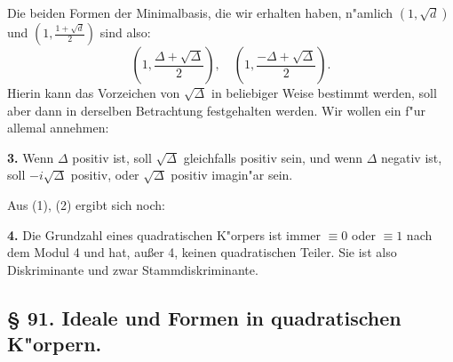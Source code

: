 \documentclass[12pt,a4paper]{article}
\theoremstyle{plain}
\begin{document}
Die beiden Formen der Minimalbasis, die wir erhalten haben, n"amlich $(1, \sqrt{d})$ und $(1, \frac{1+\sqrt{d}}{2})$ sind also:
\begin{equation}
\left(1, \frac{\Delta + \sqrt{\Delta}}{2}\right),
\quad
\left(1, \frac{-\Delta + \sqrt{\Delta}}{2}\right).
\tag{9}
\end{equation}
Hierin kann das Vorzeichen von $\sqrt{\Delta}$ in beliebiger Weise bestimmt werden, soll aber dann in derselben Betrachtung festgehalten werden. Wir wollen ein f"ur allemal annehmen:

\textbf{3.} Wenn $\Delta$ positiv ist, soll $\sqrt{\Delta}$ gleichfalls positiv sein, und wenn $\Delta$ negativ ist, soll $-i\sqrt{\Delta}$ positiv, oder $\sqrt{\Delta}$ positiv imagin"ar sein.

Aus (1), (2) ergibt sich noch:

\textbf{4.} Die Grundzahl eines quadratischen K"orpers ist immer $\equiv 0$ oder $\equiv 1$ nach dem Modul 4 und hat, au\ss er 4, keinen quadratischen Teiler. Sie ist also Diskriminante und zwar Stammdiskriminante.

\subsection*{\S{} 91. Ideale und Formen in quadratischen K"orpern.}
\end{document}
